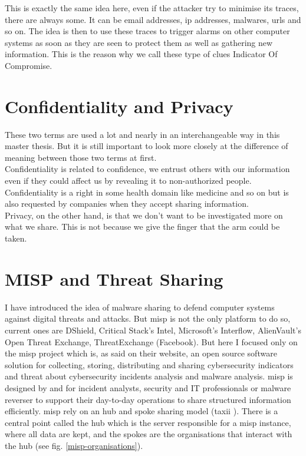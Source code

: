 \documentclass{eplmastersthesis}
\begin{document}
This is exactly the same idea here, even if the attacker try to minimise its traces, there are always some. It can be email addresses, \gls{ip} addresses, malwares, \gls{url}s and so on.
The idea is then to use these traces to trigger alarms on other computer systems as soon as they are seen to protect them as well as gathering new information. This is the reason why we call these type of clues Indicator Of Compromise.

\section{Confidentiality and Privacy}
These two terms are used a lot and nearly in an interchangeable way in this master thesis. But it is still important to look more closely at the difference of meaning between those two terms at first.\\

Confidentiality is related to confidence, we entrust others with our information even if they could affect us by revealing it to non-authorized people. Confidentiality is a right in some health domain like medicine and so on but is also requested by companies when they accept sharing information.\\

Privacy, on the other hand, is that we don't want to be investigated more on what we share. This is not because we give the finger that the arm could be taken.


\section{MISP and Threat Sharing}
I have introduced the idea of malware sharing to defend computer systems against digital threats and attacks. But \gls{misp} is not the only platform to do so, current ones are DShield, Critical Stack’s Intel, Microsoft’s Interflow, AlienVault’s Open Threat Exchange, ThreatExchange (Facebook).
But here I focused only on the \gls{misp} project which is, as said on their website, an open source software solution for collecting, storing, distributing and sharing cybersecurity indicators and threat about cybersecurity incidents analysis and malware analysis. \gls{misp} is designed by and for incident analysts, security and IT professionals or malware reverser to support their day-to-day operations to share structured information efficiently.
\gls{misp} rely on an hub and spoke sharing model (\gls{taxii} \cite{taxiiWebsite}). There is a central point called the hub which is the server responsible for a \gls{misp} instance, where all data are kept, and the spokes are the organisations that interact with the hub (see fig. \ref{misp-organisations}).\\
\end{document}
